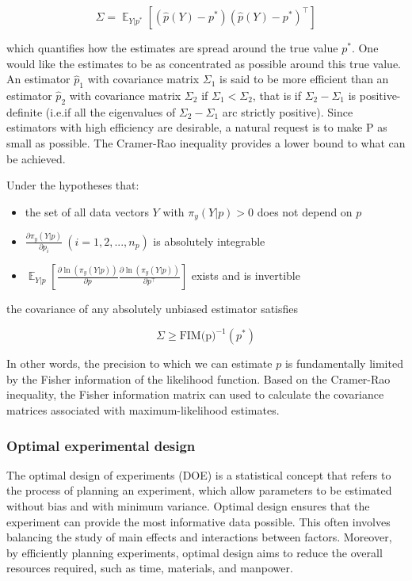 \documentclass[../Article_Design_of_Experiment.tex]{subfiles}
\begin{document}
	{\footnotesize
	\begin{equation}
		\Sigma = \mathop{\mathbb{E}}_{Y|p^*} \left[ \left( \hat{p}(Y) - p^* \right) \left( \hat{p}(Y) - p^* \right)^\top \right]
	\end{equation} }
	
	which quantifies how the estimates are spread around the true value $p^*$. One would like the estimates to be as concentrated as possible around this true value. An estimator $\hat{p}_1$ with covariance matrix $\Sigma_1$ is said to be more efficient than an estimator $\hat{p}_2$ with covariance matrix $\Sigma_2$ if $\Sigma_1 < \Sigma_2$, that is if $\Sigma_2 - \Sigma_1$ is positive-definite (i.e.if all the eigenvalues of $\Sigma_2-\Sigma_1$ arc strictly positive). Since estimators with high efficiency are desirable, a natural request is to make P as small as possible. The Cramer-Rao inequality provides a lower bound to what can be achieved.
	
	Under the hypotheses that:
	
	\begin{itemize}
		\item the set of all data vectors $Y$ with $\pi_y(Y|p) > 0$ does not depend on $p$
		\item $\frac{\partial \pi_y(Y|p)}{\partial p_i}~\left(i=1,2,...,n_p\right)$ is absolutely integrable
		\item $\mathop{\mathbb{E}}_{Y|p} \left[ \frac{\partial \ln (\pi_y (Y|p))}{\partial p} \frac{\partial \ln (\pi_y (Y|p))}{\partial p^\top} \right]$ exists and is invertible
	\end{itemize}
	
	the covariance of any absolutely unbiased estimator satisfies
	
	{\footnotesize
	\begin{equation}
		\Sigma \geq \text{FIM(p)}^{-1}(p^*)
	\end{equation} }
	
	In other words, the precision to which we can estimate $p$ is fundamentally limited by the Fisher information of the likelihood function. Based on the Cramer-Rao inequality, the Fisher information matrix can used to calculate the covariance matrices associated with maximum-likelihood estimates.
	
	\subsubsection{Optimal experimental design}
	
	The optimal design of experiments (DOE) is a statistical concept that refers to the process of planning an experiment, which allow parameters to be estimated without bias and with minimum variance. Optimal design ensures that the experiment can provide the most informative data possible. This often involves balancing the study of main effects and interactions between factors. Moreover, by efficiently planning experiments, optimal design aims to reduce the overall resources required, such as time, materials, and manpower.
	
\end{document}

